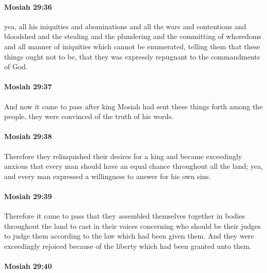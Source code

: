 		\paragraph{Mosiah 29:36} %
			\label{MOSIAH-29-36}

			yea, all his iniquities and abominations
			and all the wars and contentions and bloodshed
			and the stealing and the plundering
			and the committing of whoredoms
			and all manner of iniquities which cannot be enumerated,
			telling them that these things ought not to be,
			that they was expressly repugnant to the commandments of God.

		\paragraph{Mosiah 29:37} %
			\label{MOSIAH-29-37}

			And now it came to pass
			after king Mosiah had sent these things forth among the people,
			they were convinced of the truth of his words.

		\paragraph{Mosiah 29:38} %
			\label{MOSIAH-29-38}

			Therefore they relinquished their desires for a king
			and became exceedingly anxious
			that every man should have an equal chance throughout all the land;
			yea, and every man expressed a willingness to answer for his own sins.

		\paragraph{Mosiah 29:39} %
			\label{MOSIAH-29-39}

			Therefore it came to pass that
			they assembled themselves together in bodies throughout the land
			to cast in their voices concerning who should be their judges
			to judge them according to the law which had been given them.
			And they were exceedingly rejoiced
			because of the liberty which had been granted unto them.

		\paragraph{Mosiah 29:40} %
			\label{MOSIAH-29-40}

